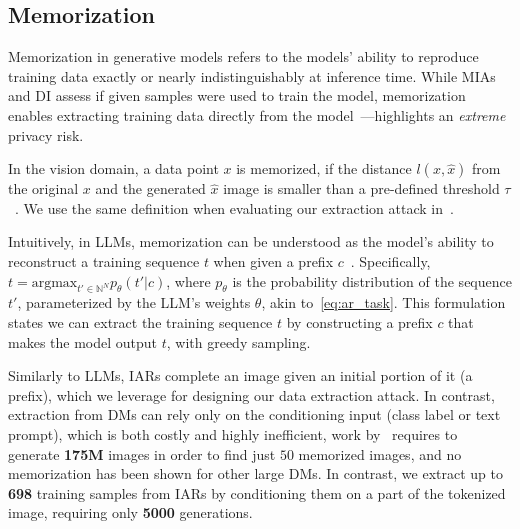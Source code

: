 \subsection{Memorization}
\label{sec:memorization}

Memorization in generative models refers to the models' ability to reproduce training data exactly or nearly indistinguishably at inference time. While MIAs and DI assess if given samples were used to train the model, memorization enables extracting training data directly from the model~\citep{carlini2021extractLLM,carlini2023extracting}---highlights an \textit{extreme} privacy risk.

In the vision domain, a data point $x$ is memorized, if the distance $l(x,\hat{x})$ from the original $x$ and the generated $\hat{x}$ image is smaller than a pre-defined threshold $\tau$~\citep{carlini2023extracting}. We use the same definition when evaluating our extraction attack in~. 

Intuitively, in LLMs, memorization can be understood as the model’s ability to reconstruct a training sequence $t$ when given a prefix $c$~\citep{carlini2021extractLLM}. 
Specifically, $t=\text{argmax}_{t'\in\mathbb{N}^{N}}p_\theta(t'|c)$, where $p_\theta$ is the probability distribution of the sequence $t'$, parameterized by the LLM's weights $\theta$, akin to~\cref{eq:ar_task}. 
This formulation states we can extract the training sequence $t$ by constructing a prefix $c$ that makes the model output $t$, with greedy sampling. 

Similarly to LLMs, IARs complete an image given an initial portion of it (a prefix), which we leverage for designing our data extraction attack. In contrast, extraction from DMs can rely only on the conditioning input (class label or text prompt), which is both costly and highly inefficient, \eg work by~\citet{carlini2023extracting} requires to generate \textbf{175M} images in order to find just $50$ memorized images, and no memorization has been shown for other large DMs. In contrast, we extract up to \textbf{698} training samples from IARs by conditioning them on a part of the tokenized image, requiring only \textbf{5000} generations.































